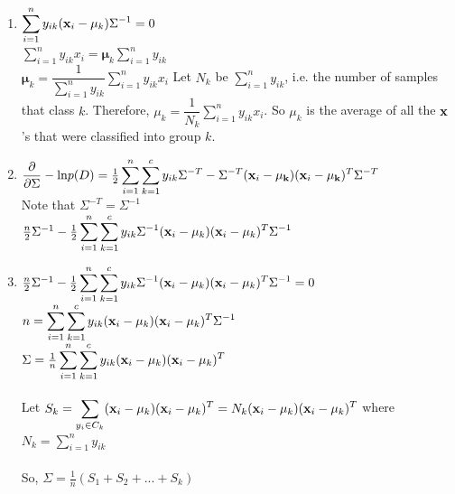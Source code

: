 \documentclass[submit]{harvardml}
\begin{document}
\begin{enumerate}
\item $\displaystyle\sum_{i=1}^{n}y_{ik}(\mathbf{x}_i - \mathbf{\mu}_k)\Sigma^{-1} = 0$ \\
$\displaystyle\sum_{i = 1}^{n}y_{ik}x_i = \mathbf{\mu}_k\displaystyle\sum_{i = 1}^{n}y_{ik}$ \\
$\mathbf{\mu}_k = \dfrac{1}{\displaystyle\sum_{i = 1}^{n}y_{ik}} \displaystyle\sum_{i = 1}^{n}y_{ik}x_i$
Let $N_k$ be $\displaystyle\sum_{i = 1}^{n}y_{ik}$, i.e. the number of samples that class $k$.  Therefore, $\mu_k = \dfrac{1}{N_k}\displaystyle\sum_{i = 1}^{n}y_{ik}x_i$.  So $\mu_k$ is the average of all the $\mathbf{x}$'s that were classified into group $k$.  

\item $\dfrac{\partial}{\partial\Sigma}-\textup{ln}p(D) = \frac{1}{2}\displaystyle\sum_{i=1}^{n}\sum_{k=1}^{c}y_{ik}\Sigma^{-T} - \Sigma^{-T}(\mathbf{x}_i-\mathbf{\mu_k})(\mathbf{x}_i-\mathbf{\mu_k})^T\Sigma^{-T} $ \\
Note that $\Sigma^{-T} = \Sigma^{-1}$ \\
$\frac{n}{2}\Sigma^{-1} - \frac{1}{2}\displaystyle\sum_{i=1}^{n}\sum_{k=1}^{c}y_{ik}\Sigma^{-1}(\mathbf{x}_i-\mu_k)(\mathbf{x}_i-\mu_k)^T\Sigma^{-1}$

\item $\frac{n}{2}\Sigma^{-1} - \frac{1}{2}\displaystyle\sum_{i=1}^{n}\sum_{k=1}^{c}y_{ik}\Sigma^{-1}(\mathbf{x}_i-\mu_k)(\mathbf{x}_i-\mu_k)^T\Sigma^{-1} = 0$ \\
$n = \displaystyle\sum_{i=1}^{n}\sum_{k=1}^{c}y_{ik}(\mathbf{x}_i-\mu_k)(\mathbf{x}_i-\mu_k)^T\Sigma^{-1}$  \\
$\Sigma = \frac{1}{n}\displaystyle\sum_{i=1}^{n}\sum_{k=1}^{c}y_{ik}(\mathbf{x}_i-\mu_k)(\mathbf{x}_i-\mu_k)^T$ \\\\
Let $S_k = \displaystyle\sum_{y_i \in C_k}(\mathbf{x}_i-\mu_k)(\mathbf{x}_i-\mu_k)^T = N_k(\mathbf{x}_i-\mu_k)(\mathbf{x}_i-\mu_k)^T$ where $N_k = \displaystyle\sum_{i=1}^{n}y_{ik}$ \\\\
So, $\Sigma = \frac{1}{n}(S_1 + S_2 + ... + S_k)$
\end{enumerate}







\newpage
\end{document}
